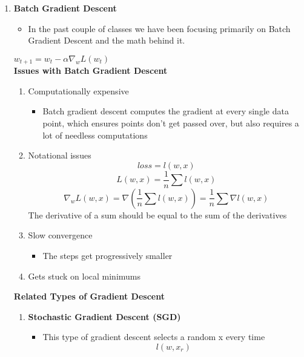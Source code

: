 \begin{enumerate}
    \item \textbf{Batch Gradient Descent}
    \begin{itemize}
        \item In the past couple of classes we have been focusing primarily on Batch Gradient Descent and the math behind it.
    \end{itemize} 
    $w_{t+1} = w_t - \alpha \nabla _w L(w_t)$ \\
    \textbf{Issues with Batch Gradient Descent}
    \begin{enumerate}
        \item Computationally expensive
        \begin{itemize}
            \item Batch gradient descent computes the gradient at every single data point, which ensures points don't get passed over, but also requires a lot of needless computations
        \end{itemize} 
        \item Notational issues
        \[
        loss = l(w,x)
        \]
        \[
        L(w,x) = \frac{1}{n} \sum l(w,x)
        \]
        \[
        \nabla_w L(w,x)=\nabla (\frac{1}{n} \sum l(w,x)) = \frac{1}{n} \sum \nabla l(w,x)
        \]
        The derivative of a sum should be equal to the sum of the derivatives
        \item Slow convergence
        \begin{itemize}
            \item The steps get progressively smaller
        \end{itemize}
        \item Gets stuck on local minimums
    \end{enumerate}
    \textbf{Related Types of Gradient Descent}
    \begin{enumerate}
        \item \textbf{Stochastic Gradient Descent (SGD)}
        \begin{itemize}
            \item This type of gradient descent selects a random x every time
            \[
            l(w,x_r)
            \]
        \end{itemize}


\end{enumerate}
\end{enumerate}

